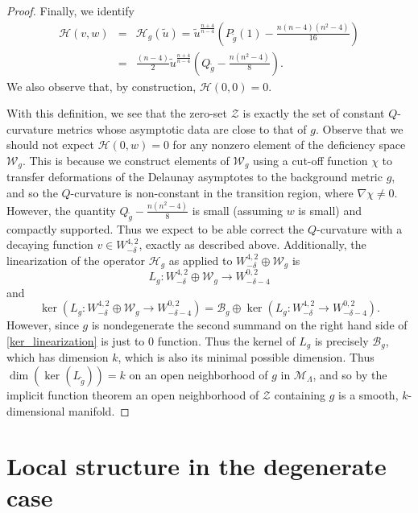 \documentclass[reqno,11pt]{amsart}
\theoremstyle{tttheorem}
\begin{document}
\begin{proof}
Finally, we identify 
\begin{eqnarray} \label{deformation_op1} 
\mathcal{H}(v,w) & = & \mathcal{H}_g(\widetilde u) = 
\widetilde{u}^{\frac{n+4}{n-4}} \left ( P_{\widetilde g} (1) - 
\frac{n(n-4)(n^2-4)}{16} \right ) \\ \nonumber 
& = & \frac{(n-4)}{2} \widetilde {u}^{\frac{n+4}{n-4}} \left ( 
Q_{\widetilde g} - \frac{n(n^2-4)}{8} \right ). \end{eqnarray}
We also observe that, by construction, $\mathcal{H} (0,0) = 0$.

With this definition, we see that the zero-set $\mathcal{Z}$ is exactly the set of 
constant $Q$-curvature metrics whose asymptotic data are 
close to that of $g$. Observe that we should not expect $\mathcal{H}(0,w)= 0$ 
for any nonzero element of the deficiency space $\mathcal{W}_g$. This is because 
we construct elements of $\mathcal{W}_g$ using a cut-off function $\chi$ 
to transfer deformations of the Delaunay asymptotes to the 
background metric $g$, and so the $Q$-curvature is non-constant 
in the transition region, where $\nabla \chi \neq 0$. However, the 
quantity $\displaystyle Q_{\widetilde g} - \frac{n(n^2-4)}{8}$ is small 
(assuming $w$ is small) and compactly supported. Thus we expect to 
be able correct the $Q$-curvature with a decaying function $v \in W^{4,2}_{-\delta}$, 
exactly as described above. Additionally, the linearization of the 
operator $\mathcal{H}_g$ as applied to $W^{4,2}_{-\delta} \oplus 
\mathcal{W}_g$ is 
$$L_g : W^{4,2}_{-\delta} \oplus \mathcal{W}_g \rightarrow 
W^{0,2}_{-\delta-4} $$
and
\begin{equation} \label{ker_linearization}
\ker \left (L_g: W^{4,2}_{-\delta} \oplus \mathcal{W}_g \rightarrow 
W^{0,2}_{-\delta-4}\right ) = \mathcal{B}_g \oplus \ker \left (L_g: W^{4,2}_{-\delta} \rightarrow 
W^{0,2}_{-\delta-4}\right ).\end{equation} 
However, since $g$ is nondegenerate the second summand on the right 
hand side of \eqref{ker_linearization} is just to $0$ function. 
Thus the kernel of $L_g$ is precisely $\mathcal{B}_g$, 
which has dimension $k$, which is also its minimal possible dimension. 
Thus $\dim(\ker(L_{\widetilde g})) = k$ on an open neighborhood of 
$g$ in $\mathcal{M}_\Lambda$, and so by the implicit function theorem 
an open neighborhood of $\mathcal{Z}$ containing $g$ is a smooth, 
$k$-dimensional manifold. 
\end{proof} 

\section{Local structure in the degenerate case} \label{sec:degen} 
\end{document}
